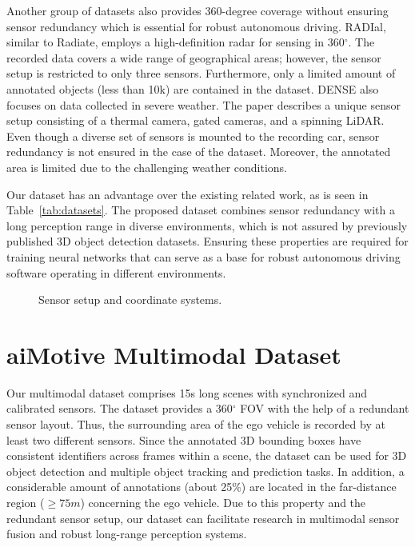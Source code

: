 \documentclass{article}
\begin{document}
Another group of datasets also provides 360-degree coverage without ensuring sensor redundancy which is essential for robust autonomous driving. RADIal\citep{radial}, similar to Radiate, employs a high-definition radar for sensing in 360$^{\circ}$. The recorded data covers a wide range of geographical areas; however, the sensor setup is restricted to only three sensors. Furthermore, only a limited amount of annotated objects (less than 10k) are contained in the dataset. DENSE \citep{dense} also focuses on data collected in severe weather. The paper describes a unique sensor setup consisting of a thermal camera, gated cameras, and a spinning LiDAR. Even though a diverse set of sensors is mounted to the recording car, sensor redundancy is not ensured in the case of the dataset. Moreover, the annotated area is limited due to the challenging weather conditions.
 
Our dataset has an advantage over the existing related work, as is seen in Table~\ref{tab:datasets}. The proposed dataset combines sensor redundancy with a long perception range in diverse environments, which is not assured by previously published 3D object detection datasets. Ensuring these properties are required for training neural networks that can serve as a base for robust autonomous driving software operating in different environments.


\begin{figure}
\begin{floatrow}
{\caption{Sensor setup and coordinate systems.}\label{fig:sensor_setup}
}

\end{floatrow}
\end{figure}


\section{aiMotive Multimodal Dataset}
\label{sec:dataset}

Our multimodal dataset comprises 15s long scenes with synchronized and calibrated sensors. The dataset provides a 360$^{\circ}$ FOV with the help of a redundant sensor layout. Thus, the surrounding area of the ego vehicle is recorded by at least two different sensors. Since the annotated 3D bounding boxes have consistent identifiers across frames within a scene, the dataset can be used for 3D object detection and multiple object tracking and prediction tasks. In addition, a considerable amount of annotations (about 25\%) are located in the far-distance region ($\geq75m$) concerning the ego vehicle. Due to this property and the redundant sensor setup, our dataset can facilitate research in multimodal sensor fusion and robust long-range perception systems.
\end{document}
